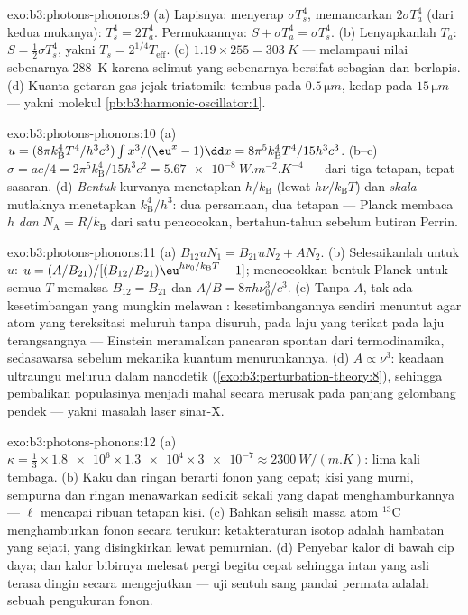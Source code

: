 \begin{solution}{exo:b3:photons-phonons:9}
(a) Lapisnya: menyerap $\sigma T_s^4$, memancarkan $2\sigma T_a^4$ (dari kedua
mukanya): $T_s^4 = 2T_a^4$. Permukaannya: $S + \sigma T_a^4 = \sigma
T_s^4$. (b) Lenyapkanlah $T_a$: $S = \tfrac12\sigma T_s^4$, yakni
$T_s = 2^{1/4}T_{\text{eff}}$. (c) $1.19 \times 255 =
\qty{303}{K}$ --- melampaui nilai sebenarnya \qty{288}{K} karena
selimut yang sebenarnya bersifat sebagian dan berlapis. (d) Kuanta
getaran gas jejak triatomik: tembus pada $0.5\,\unit{\micro m}$,
kedap pada $15\,\unit{\micro m}$ ---
yakni molekul \cref{pb:b3:harmonic-oscillator:1}.
\end{solution}

\begin{solution}{exo:b3:photons-phonons:10}
(a) $u = (8\pi k_{\text{B}}^4T^4/h^3c^3)\int x^3/(\eu^x - 1)\dd x
= 8\pi^5k_{\text{B}}^4T^4/15h^3c^3$. (b--c) $\sigma = ac/4 =
2\pi^5k_{\text{B}}^4/15h^3c^2 = \qty{5.67e-8}{W.m^{-2}.K^{-4}}$
--- dari tiga tetapan, tepat sasaran. (d) \emph{Bentuk} kurvanya
menetapkan $h/k_{\text{B}}$ (lewat $h\nu/k_{\text{B}}T$) dan
\emph{skala} mutlaknya menetapkan $k_{\text{B}}^4/h^3$: dua persamaan,
dua tetapan --- Planck membaca $h$ \emph{dan} $N_{\text{A}} =
R/k_{\text{B}}$ dari satu pencocokan, bertahun-tahun sebelum butiran Perrin.
\end{solution}

\begin{solution}{exo:b3:photons-phonons:11}
(a) $B_{12}uN_1 = B_{21}uN_2 + AN_2$. (b) Selesaikanlah untuk $u$:
$u = (A/B_{21})/[(B_{12}/B_{21})\eu^{h\nu_0/k_{\text{B}}T} - 1]$;
mencocokkan bentuk Planck untuk semua $T$ memaksa $B_{12} = B_{21}$ dan
$A/B = 8\pi h\nu_0^3/c^3$. (c) Tanpa $A$, tak ada kesetimbangan yang
mungkin melawan : kesetimbangannya sendiri menuntut agar atom
yang tereksitasi meluruh tanpa disuruh, pada laju yang terikat pada laju
terangsangnya --- Einstein meramalkan pancaran spontan dari
termodinamika, sedasawarsa sebelum mekanika kuantum menurunkannya. (d) $A \propto
\nu^3$: keadaan ultraungu meluruh dalam nanodetik
(\cref{exo:b3:perturbation-theory:8}), sehingga pembalikan populasinya
menjadi mahal secara merusak pada panjang gelombang pendek --- yakni
masalah laser sinar-X.
\end{solution}

\begin{solution}{exo:b3:photons-phonons:12}
(a) $\kappa = \tfrac13 \times \num{1.8e6} \times \num{1.3e4}
\times \num{3e-7} \approx \qty{2300}{W/(m.K)}$: lima kali
tembaga. (b) Kaku dan ringan berarti fonon yang cepat; kisi yang murni,
sempurna dan ringan menawarkan sedikit sekali yang dapat
menghamburkannya --- $\ell$ mencapai
ribuan tetapan kisi. (c) Bahkan selisih massa
atom $^{13}$C menghamburkan fonon secara terukur: ketakteraturan isotop
adalah hambatan yang sejati, yang disingkirkan lewat pemurnian. (d) Penyebar kalor
di bawah cip daya; dan kalor bibirnya melesat pergi begitu cepat sehingga
intan yang asli terasa dingin secara mengejutkan --- uji sentuh sang
pandai permata adalah sebuah pengukuran fonon.
\end{solution}

